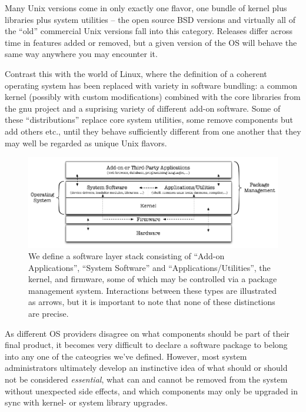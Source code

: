 Many Unix versions come in only exactly one flavor,
one bundle of kernel plus libraries plus system
utilities -- the open source BSD versions and
virtually all of the ``old'' commercial Unix versions
fall into this category.  Releases differ across time
in features added or removed, but a given version of
the OS will behave the same way anywhere you may
encounter it.

Contrast this with the world of Linux, where the
definition of a coherent operating system has been
replaced with variety in software bundling: a common
kernel (possibly with custom modifications) combined
with the core libraries from the \gls{gnu} project and
a suprising variety of different add-on software.
Some of these ``distributions'' replace core system
utilities, some remove components but add others etc.,
until they behave sufficiently different from one
another that they may well be regarded as unique Unix
flavors.  \\

\begin{figure}[t]
	\centering
	\includegraphics[width=.85\textwidth]{05/pics/types-of-software}
		\caption[Types of Software]{We define a software layer
			stack consisting of ``Add-on Applications'',
			``System Software'' and
			``Applications/Utilities'', the kernel, and
			firmware, some of which may be controlled via a
			package management system.  Interactions between
			these types are illustrated as arrows, but it is
			important to note that none of these distinctions
			are precise.
			\label{fig:software:types}}
\end{figure}


As different OS providers disagree on what components
should be part of their final product, it becomes very
difficult to declare a software package to belong into
any one of the cateogries we've defined.  However,
most system administrators ultimately develop an
instinctive idea of what should or should not be
considered {\em essential}, what can and cannot be
removed from the system without unexpected side
effects, and which components may only be upgraded in
sync with kernel- or system library upgrades.

